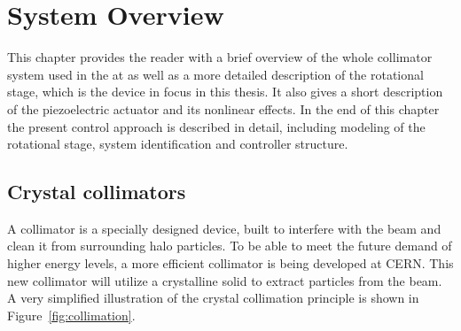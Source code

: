 \chapter{System Overview}\label{cha:systemOverview}
This chapter provides the reader with a brief overview of the whole collimator system used in the \abbrLHC at \abbrCERN as well as a more detailed description of the rotational stage, which is the device in focus in this thesis. It also gives a short description of the piezoelectric actuator and its nonlinear effects. In the end of this chapter the present control approach is described in detail, including modeling of the rotational stage, system identification and controller structure.

\section{Crystal collimators}
A collimator is a specially designed device, built to interfere with the beam and clean it from surrounding halo particles. To be able to meet the future demand of higher energy levels, a more efficient collimator is being developed at CERN. This new collimator will utilize a crystalline solid to extract particles from the beam. A very simplified illustration of the crystal collimation principle is shown in Figure~\ref{fig:collimation}.

